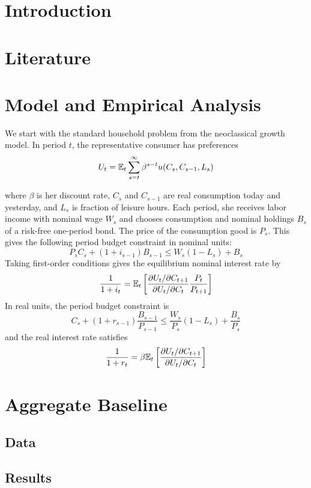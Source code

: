 \documentclass{thesis}
\begin{document}

\tableofcontents \newpage



\section{Introduction}

\section{Literature}
\cite{canzoneri07}

\section{Model and Empirical Analysis}
We start with the standard household problem from the neoclassical growth model. In period $t$, the representative consumer has preferences $$U_t = \mathbb{E}_t \sum_{s=t}^\infty \beta^{s-t} u(C_s, C_{s-1}, L_s)$$

 where $\beta$ is her discount rate, $C_s$ and $C_{s-1}$ are real consumption today and yesterday, and $L_s$ is fraction of leisure hours. Each period, she receives labor income with nominal wage $W_s$ and chooses consumption and nominal holdings $B_s$ of a risk-free one-period bond. The price of the consumption good is $P_s$. This gives the following period budget constraint in nominal units: $$P_s C_s + (1 + i_{s-1})B_{s-1} \leq W_s(1 - L_s) + B_s$$
Taking first-order conditions gives the equilibrium nominal interest rate by $$\frac{1}{1 + i_t} = \mathbb{E}_t \left[  \frac{\partial U_t / \partial C_{t+1}}{\partial U_t / \partial C_t} \frac{P_t}{P_{t+1}}  \right]$$
In real units, the period budget constraint is $$C_s + (1 + r_{s-1}) \frac{B_{s-1}}{P_{s-1}} \leq \frac{W_s}{P_s}(1 - L_s) + \frac{B_s}{P_s}$$ and the real interest rate satisfies $$\frac{1}{1 + r_t} = \beta \mathbb{E}_t \left[  \frac{\partial U_t / \partial C_{t+1}}{\partial U_t / \partial C_t}  \right]$$


\section{Aggregate Baseline}
\subsection{Data}
\subsection{Results}
\end{document}
